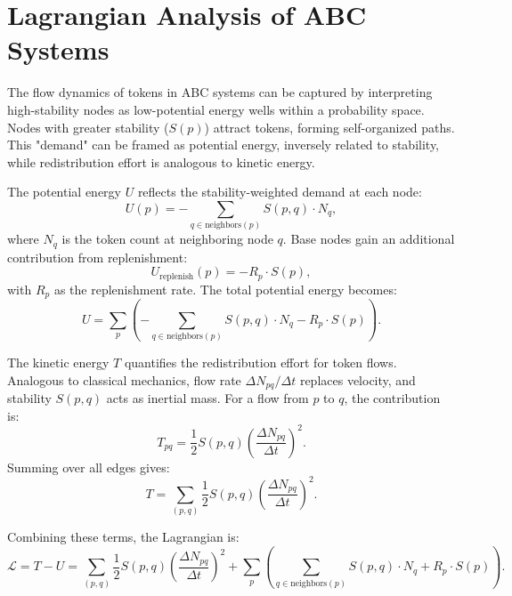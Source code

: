 \documentclass[entropy,article,submit,pdftex,oneauthor]{Definitions/mdpi}
\begin{document}
\section{Lagrangian Analysis of ABC Systems}

The flow dynamics of tokens in ABC systems can be captured by interpreting high-stability nodes as low-potential energy wells within a probability space. Nodes with greater stability (\( S(p) \)) attract tokens, forming self-organized paths. This "demand" can be framed as potential energy, inversely related to stability, while redistribution effort is analogous to kinetic energy.

The potential energy \( U \) reflects the stability-weighted demand at each node:
\begin{equation}
U(p) = -\sum_{q \in \text{neighbors}(p)} S(p, q) \cdot N_q,
\end{equation}
where \( N_q \) is the token count at neighboring node \( q \). Base nodes gain an additional contribution from replenishment:
\begin{equation}
U_{\text{replenish}}(p) = -R_p \cdot S(p),
\end{equation}
with \( R_p \) as the replenishment rate. The total potential energy becomes:
\begin{equation}
U = \sum_{p} \left( -\sum_{q \in \text{neighbors}(p)} S(p, q) \cdot N_q - R_p \cdot S(p) \right).
\end{equation}

The kinetic energy \( T \) quantifies the redistribution effort for token flows. Analogous to classical mechanics, flow rate \( \Delta N_{pq} / \Delta t \) replaces velocity, and stability \( S(p, q) \) acts as inertial mass. For a flow from \( p \) to \( q \), the contribution is:
\begin{equation}
T_{pq} = \frac{1}{2} S(p, q) \left( \frac{\Delta N_{pq}}{\Delta t} \right)^2.
\end{equation}
Summing over all edges gives:
\begin{equation}
T = \sum_{(p, q)} \frac{1}{2} S(p, q) \left( \frac{\Delta N_{pq}}{\Delta t} \right)^2.
\end{equation}

Combining these terms, the Lagrangian is:
\begin{equation}
\mathcal{L} = T - U = \sum_{(p, q)} \frac{1}{2} S(p, q) \left( \frac{\Delta N_{pq}}{\Delta t} \right)^2 + \sum_{p} \left( \sum_{q \in \text{neighbors}(p)} S(p, q) \cdot N_q + R_p \cdot S(p) \right).
\label{eq:lagrange}
\end{equation}
\end{document}
